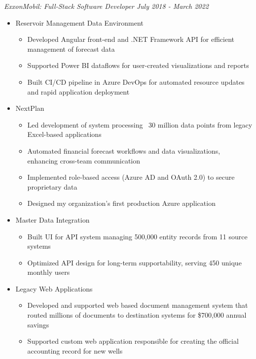 \documentclass[line,overlapped]{res}
\begin{document}
\begin{resume}
  {\sl ExxonMobil: Full-Stack Software Developer \hfill July 2018 - March 2022}
  \begin{itemize}[leftmargin=*]
    \item[] Reservoir Management Data Environment
      \begin{itemize}
        \setlength\itemsep{.1em}
        \item Developed Angular front-end and .NET Framework API for efficient management of forecast data
        \item Supported Power BI dataflows for user-created visualizations and reports
        \item Built CI/CD pipeline in Azure DevOps for automated resource updates and rapid application deployment
      \end{itemize}
    \item[] NextPlan
      \begin{itemize}
        \setlength\itemsep{.1em}
        \item Led development of system processing ~30 million data points from legacy Excel-based applications
        \item Automated financial forecast workflows and data visualizations, enhancing cross-team communication
        \item Implemented role-based access (Azure AD and OAuth 2.0) to secure proprietary data
        \item Designed my organization's first production Azure application 
      \end{itemize}
    \item[] Master Data Integration
      \begin{itemize}
        \setlength\itemsep{.1em}
        \item Built UI for API system managing 500,000 entity records from 11 source systems
        \item Optimized API design for long-term supportability, serving 450 unique monthly users
      \end{itemize}
    \item[] Legacy Web Applications
      \begin{itemize}
        \setlength\itemsep{.1em}
        \item Developed and supported web based document management system that routed millions of documents to destination systems for \$700,000 annual savings
        \item Supported custom web application responsible for creating the official accounting record for new wells
      \end{itemize}
  \end{itemize}


\end{resume}
\end{document}
